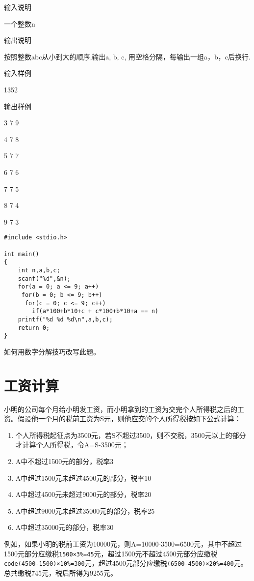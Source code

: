 输入说明
	
一个整数n

输出说明
	
按照整数abc从小到大的顺序,输出a, b, c, 用空格分隔，每输出一组a，b，c后换行.

输入样例
	
1352

输出样例
	
3 7 9

4 7 8

5 7 7

6 7 6

7 7 5

8 7 4

9 7 3

\begin{lstlisting}
#include <stdio.h>

int main()
{
	int n,a,b,c;
	scanf("%d",&n);
	for(a = 0; a <= 9; a++)
	 for(b = 0; b <= 9; b++)
	  for(c = 0; c <= 9; c++)
	    if(a*100+b*10+c + c*100+b*10+a == n)
	printf("%d %d %d\n",a,b,c);
	return 0;
} 
\end{lstlisting}

\begin{note}[思考]
	如何用数字分解技巧改写此题。
\end{note}

\section{工资计算}
小明的公司每个月给小明发工资，而小明拿到的工资为交完个人所得税之后的工资。假设他一个月的税前工资为S元，则他应交的个人所得税按如下公式计算：
\begin{enumerate}
	\item 个人所得税起征点为3500元，若S不超过3500，则不交税，3500元以上的部分才计算个人所得税，令A=S-3500元；
	\item A中不超过1500元的部分，税率3%
	\item A中超过1500元未超过4500元的部分，税率10%
	\item A中超过4500元未超过9000元的部分，税率20%
	\item A中超过9000元未超过35000元的部分，税率25%
	\item A中超过35000元的部分，税率30%
\end{enumerate}
例如，如果小明的税前工资为10000元，则A=10000-3500=6500元，其中不超过1500元部分应缴税\lstinline|1500×3%=45|元，超过1500元不超过4500元部分应缴税\lstinline|code(4500-1500)×10%=300|元，超过4500元部分应缴税\lstinline|(6500-4500)×20%=400|元。总共缴税745元，税后所得为9255元。

